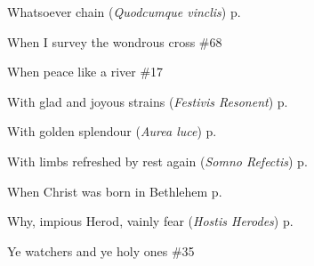 \begin{hangparas}{1.25em}{1}
\par\noindent
Whatsoever chain (\textit{Quodcumque vinclis}) \dotfill p. \pageref{PeterAntiochEvensong}
\par\noindent
When I survey the wondrous cross \dotfill \#68
\par\noindent
When peace like a river \dotfill \#17
\par\noindent
With glad and joyous strains (\textit{Festivis Resonent}) \dotfill p. \pageref{PreciousBloodEvensong}
\par\noindent
With golden splendour (\textit{Aurea luce}) \dotfill p. \pageref{PeterEvensong} \par\noindent
With limbs refreshed by rest again (\textit{Somno Refectis}) \dotfill p. \pageref{MondayInvitatory}
\par\noindent
When Christ was born in Bethlehem \dotfill p. \pageref{WalsinghamMattins}
\par\noindent
Why, impious Herod, vainly fear (\textit{Hostis Herodes}) \dotfill p. \pageref{EpiphanyEvensong}
\par\noindent
Ye watchers and ye holy ones \dotfill \#35
\end{hangparas}

\normalsize

